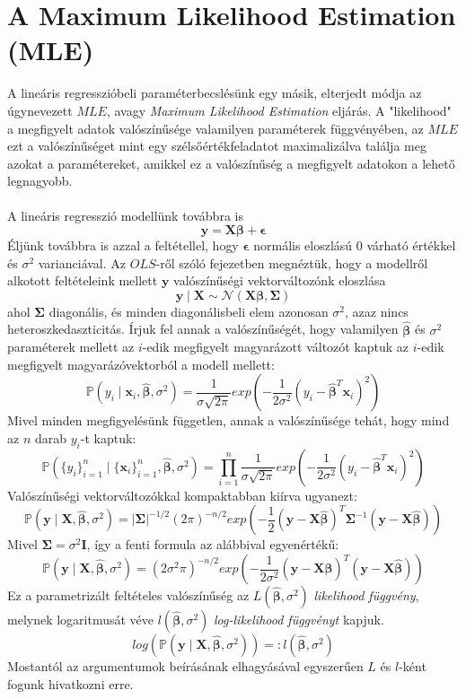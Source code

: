 \documentclass[14p]{report}
\def\pmb{\boldsymbol}
\def\ebeta{\hat{\pmb{\beta}}}
\def\e{\epsilon}
\newcounter{x}
\newcounter{y}
\newcounter{z}
\begin{document}
	\chapter{A Maximum Likelihood Estimation (MLE)}
	A lineáris regresszióbeli paraméterbecslésünk egy másik, elterjedt módja az úgynevezett $MLE$, avagy \emph{Maximum Likelihood Estimation} eljárás. A "likelihood" a megfigyelt adatok valószínűsége valamilyen paraméterek függvényében, az $MLE$ ezt a valószínűséget mint egy szélsőértékfeladatot maximalizálva találja meg azokat a paramétereket, amikkel ez a valószínűség a megfigyelt adatokon a lehető legnagyobb.
	\\
	\\
	A lineáris regresszió modellünk továbbra is
	\[
		\pmb{y} = \pmb{X}\pmb{\beta} + \pmb{\e}
	\]
	Éljünk továbbra is azzal a feltétellel, hogy $\pmb{\e}$ normális eloszlású $0$ várható értékkel és $\sigma^2$ varianciával. Az $OLS$-ről szóló fejezetben megnéztük, hogy a modellről alkotott feltételeink mellett $\pmb{y}$ valószínűségi vektorváltozónk eloszlása
	\[
		\pmb{y} \mid \pmb{X} \sim \mathcal{N}(\pmb{X}\pmb{\beta}, \pmb{\Sigma})
	\]
	ahol $\pmb{\Sigma}$ diagonális, és minden diagonálisbeli elem azonosan $\sigma^2$, azaz nincs heteroszkedaszticitás. Írjuk fel annak a valószínűségét, hogy valamilyen $\ebeta$ és $\sigma^2$ paraméterek mellett az $i$-edik megfigyelt magyarázott változót kaptuk az $i$-edik megfigyelt magyarázóvektorból a modell mellett:
	\[
		\mathbb{P}(y_i \mid \pmb{x}_i, \ebeta, \sigma^2) = \frac{1}{\sigma\sqrt{2\pi}}exp \left(
			-\frac{1}{2\sigma^2}(y_i - \ebeta^T\pmb{x}_i)^2
		\right)
	\] 
	Mivel minden megfigyelésünk független, annak a valószínűsége tehát, hogy mind az $n$ darab $y_i$-t kaptuk:
	\[
		\mathbb{P}(\{y_i\}_{i=1}^{n} \mid \{\pmb{x}_i\}_{i=1}^{n}, \ebeta, \sigma^2) = \prod_{i=1}^{n}{
		\frac{1}{\sigma\sqrt{2\pi}}exp \left(
		-\frac{1}{2\sigma^2}(y_i - \ebeta^T\pmb{x}_i)^2
		\right)	
		}
	\]
	Valószínűségi vektorváltozókkal kompaktabban kiírva ugyanezt:
	\[
		\mathbb{P}(\pmb{y} \mid \pmb{X}, \ebeta, \sigma^2) = |\pmb{\Sigma}|^{-1/2}(2\pi)^{-n/2}exp\left(
			-\frac{1}{2}(\pmb{y} - \pmb{X}\ebeta)^T\pmb{\Sigma}^{-1}(\pmb{y} - \pmb{X}\ebeta)
		\right)
	\]
	Mivel $\pmb{\Sigma} = \sigma^2\pmb{I}$, így a fenti formula az alábbival egyenértékű:
	\[
		\mathbb{P}(\pmb{y} \mid \pmb{X}, \ebeta, \sigma^2) = (2\sigma^2\pi)^{-n/2}exp\left(
			-\frac{1}{2\sigma^2}(\pmb{y} - \pmb{X}\ebeta)^T(\pmb{y} - \pmb{X}\ebeta)
		\right)
	\]
	Ez a parametrizált feltételes valószínűség az $L(\ebeta, \sigma^2)$ \emph{likelihood függvény}, melynek logaritmusát véve $l(\ebeta, \sigma^2)$ \emph{log-likelihood függvényt} kapjuk.
	\[
		log(\mathbb{P}(\pmb{y} \mid \pmb{X}, \ebeta, \sigma^2)) =: l(\ebeta, \sigma^2)
	\] 
	Mostantól az argumentumok beírásának elhagyásával egyszerűen $L$ és $l$-ként fogunk hivatkozni erre.
	
\end{document}
